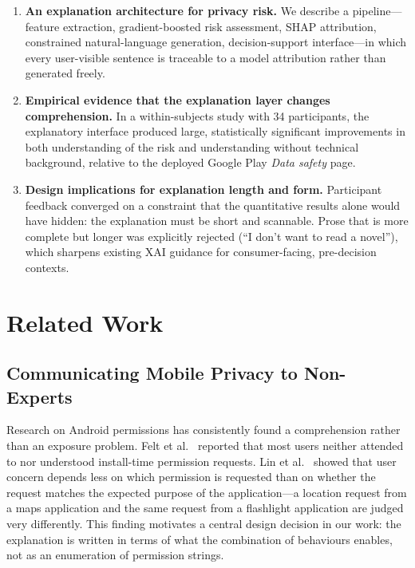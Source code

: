 \documentclass[sigconf]{acmart}
\begin{document}
\begin{enumerate}[leftmargin=*, itemsep=2pt]
  \item \textbf{An explanation architecture for privacy risk.} We describe a
  pipeline---feature extraction, gradient-boosted risk assessment, SHAP
  attribution, constrained natural-language generation, decision-support
  interface---in which every user-visible sentence is traceable to a model
  attribution rather than generated freely.
  \item \textbf{Empirical evidence that the explanation layer changes
  comprehension.} In a within-subjects study with 34 participants, the
  explanatory interface produced large, statistically significant
  improvements in both understanding of the risk and understanding without
  technical background, relative to the deployed Google Play
  \emph{Data safety} page.
  \item \textbf{Design implications for explanation length and form.}
  Participant feedback converged on a constraint that the quantitative
  results alone would have hidden: the explanation must be short and
  scannable. Prose that is more complete but longer was explicitly rejected
  (``I don't want to read a novel''), which sharpens existing XAI guidance
  for consumer-facing, pre-decision contexts.
\end{enumerate}

\section{Related Work}

\subsection{Communicating Mobile Privacy to Non-Experts}

Research on Android permissions has consistently found a comprehension
rather than an exposure problem. Felt et al.~\cite{felt2012permissions}
reported that most users neither attended to nor understood install-time
permission requests. Lin et al.~\cite{lin2012expectation} showed that user
concern depends less on which permission is requested than on whether the
request matches the expected purpose of the application---a location
request from a maps application and the same request from a flashlight
application are judged very differently. This finding motivates a central
design decision in our work: the explanation is written in terms of what
the combination of behaviours enables, not as an enumeration of permission
strings.
\end{document}
